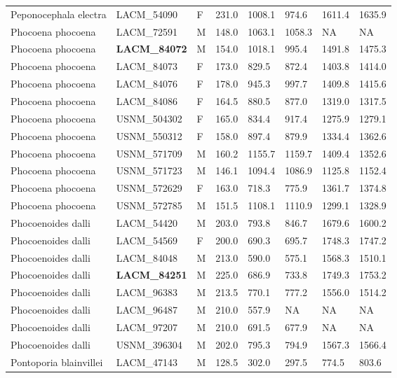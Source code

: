 \begin{longtable}{|p{1.95in}p{1.1in}p{.15in}p{.4in}p{.4in}p{.4in}p{.4in}p{.4in}|}
  Peponocephala electra & LACM\_54090 & F & 231.0 & 1008.1 & 974.6 & 1611.4 & 1635.9 \\ 
  Phocoena phocoena & LACM\_72591 & M & 148.0 & 1063.1 & 1058.3 & NA & NA  \\ 
  Phocoena phocoena & \textbf{ LACM\_84072 } & M & 154.0 & 1018.1 & 995.4 & 1491.8 & 1475.3 \\ 
  Phocoena phocoena & LACM\_84073 & F & 173.0 & 829.5 & 872.4 & 1403.8 & 1414.0 \\ 
  Phocoena phocoena & LACM\_84076 & F & 178.0 & 945.3 & 997.7 & 1409.8 & 1415.6 \\ 
  Phocoena phocoena & LACM\_84086 & F & 164.5 & 880.5 & 877.0 & 1319.0 & 1317.5 \\ 
  Phocoena phocoena & USNM\_504302 & F & 165.0 & 834.4 & 917.4 & 1275.9 & 1279.1 \\ 
  Phocoena phocoena & USNM\_550312 & F & 158.0 & 897.4 & 879.9 & 1334.4 & 1362.6 \\ 
  Phocoena phocoena & USNM\_571709 & M & 160.2 & 1155.7 & 1159.7 & 1409.4 & 1352.6 \\ 
  Phocoena phocoena & USNM\_571723 & M & 146.1 & 1094.4 & 1086.9 & 1125.8 & 1152.4 \\ 
  Phocoena phocoena & USNM\_572629 & F & 163.0 & 718.3 & 775.9 & 1361.7 & 1374.8 \\ 
  Phocoena phocoena & USNM\_572785 & M & 151.5 & 1108.1 & 1110.9 & 1299.1 & 1328.9 \\ 
  Phocoenoides dalli & LACM\_54420 & M & 203.0 & 793.8 & 846.7 & 1679.6 & 1600.2 \\ 
  Phocoenoides dalli & LACM\_54569 & F & 200.0 & 690.3 & 695.7 & 1748.3 & 1747.2 \\ 
  Phocoenoides dalli & LACM\_84048 & M & 213.0 & 590.0 & 575.1 & 1568.3 & 1510.1 \\ 
  Phocoenoides dalli & \textbf{ LACM\_84251 } & M & 225.0 & 686.9 & 733.8 & 1749.3 & 1753.2 \\ 
  Phocoenoides dalli & LACM\_96383 & M & 213.5 & 770.1 & 777.2 & 1556.0 & 1514.2 \\ 
  Phocoenoides dalli & LACM\_96487 & M & 210.0 & 557.9 & NA & NA & NA  \\ 
  Phocoenoides dalli & LACM\_97207 & M & 210.0 & 691.5 & 677.9 & NA &  NA \\ 
  Phocoenoides dalli & USNM\_396304 & M & 202.0 & 795.3 & 794.9 & 1567.3 & 1566.4 \\ 
  Pontoporia blainvillei & LACM\_47143 & M & 128.5 & 302.0 & 297.5 & 774.5 & 803.6 \\ 

\end{longtable}

